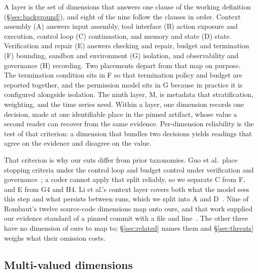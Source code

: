 A layer is the set of dimensions that answers one clause of the working definition
(\S\ref{sec:background}), and eight of the nine follow the clauses in order. Context assembly (A)
answers input assembly, tool interface (B) action exposure and execution, control loop (C)
continuation, and memory and state (D) state. Verification and repair (E) answers checking and repair,
budget and termination (F) bounding, sandbox and environment (G) isolation, and observability and
governance (H) recording. Two placements depart from that map on purpose. The termination condition
sits in F so that termination policy and budget are reported together, and the permission model sits in
G because in practice it is configured alongside isolation. The ninth layer, M, is metadata that
stratification, weighting, and the time series need. Within a layer, one dimension records one
decision, made at one identifiable place in the pinned artifact, whose value a second reader can
recover from the same evidence. Per-dimension reliability is the test of that criterion: a dimension
that bundles two decisions yields readings that agree on the evidence and disagree on the value.

That criterion is why our cuts differ from prior taxonomies. Guo et al.\ place stopping criteria under
the control loop and budget control under verification and governance~\citep{guo2026qa2task}; a coder
cannot apply that split reliably, so we separate C from F, and E from G4 and H4. Li et al.'s context
layer covers both what the model sees this step and what persists between runs, which we split into A
and D~\citep{li2026harnessengineering}. Nine of Rombaut's twelve source-code dimensions map onto ours,
and that work supplied our evidence standard of a pinned commit with a file and
line~\citep{rombaut2026insidescaffold}. The other three have no dimension of ours to map to;
\S\ref{sec:related} names them and \S\ref{sec:threats} weighs what their omission costs.

\subsection{Multi-valued dimensions}\label{subsec:multivalued}

